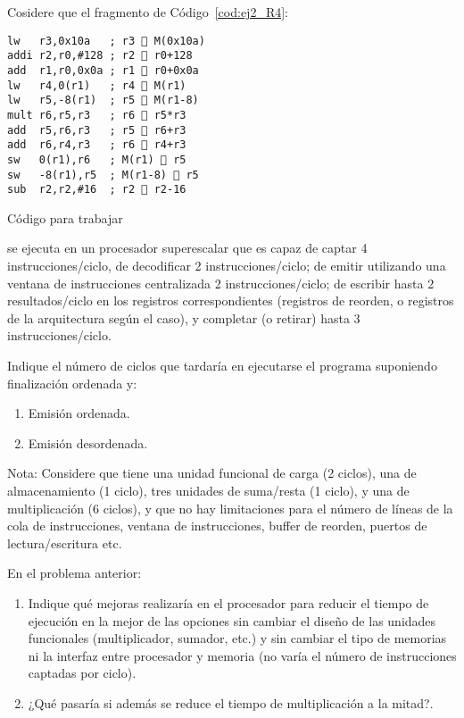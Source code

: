 \begin{ejercicio}
    Cosidere que el fragmento de Código~\ref{cod:ej2_R4}:
    \begin{listing}[H]
    \begin{verbatim}
lw   r3,0x10a   ; r3  M(0x10a)
addi r2,r0,#128 ; r2  r0+128
add  r1,r0,0x0a ; r1  r0+0x0a
lw   r4,0(r1)   ; r4  M(r1)
lw   r5,-8(r1)  ; r5  M(r1-8)
mult r6,r5,r3   ; r6  r5*r3
add  r5,r6,r3   ; r5  r6+r3
add  r6,r4,r3   ; r6  r4+r3
sw   0(r1),r6   ; M(r1)  r5
sw   -8(r1),r5  ; M(r1-8)  r5
sub  r2,r2,#16  ; r2  r2-16
    \end{verbatim}
    \caption{Código para trabajar}
    \label{cod:ej2_R4}
    \end{listing}
se ejecuta en un procesador superescalar que es capaz de captar 4 instrucciones/ciclo, de decodificar 2 instrucciones/ciclo; de emitir utilizando una ventana de instrucciones centralizada 2 instrucciones/ciclo; de escribir hasta 2 resultados/ciclo en los registros correspondientes (registros de reorden, o registros de la arquitectura según el caso), y completar (o retirar) hasta 3 instrucciones/ciclo.

Indique el número de ciclos que tardaría en ejecutarse el programa suponiendo finalización ordenada y:
\begin{enumerate}
    \item Emisión ordenada.
    \item Emisión desordenada.
\end{enumerate}
Nota: Considere que tiene una unidad funcional de carga (2 ciclos), una de almacenamiento (1 ciclo), tres unidades de suma/resta (1 ciclo), y una de multiplicación (6 ciclos), y que no hay limitaciones para el número de líneas de la cola de instrucciones, ventana de instrucciones, buffer de reorden, puertos de lectura/escritura etc.
\end{ejercicio}

\begin{ejercicio}\label{ej:3_R4}
   En el problema anterior: 
   \begin{enumerate}
       \item Indique qué mejoras realizaría en el procesador para reducir el tiempo de ejecución en la mejor de las opciones sin cambiar el diseño de las unidades funcionales (multiplicador, sumador, etc.) y sin cambiar el tipo de memorias ni la interfaz entre procesador y memoria (no varía el número de instrucciones captadas por ciclo).
       \item ¿Qué pasaría si además se reduce el tiempo de multiplicación a la mitad?. 
   \end{enumerate}
\end{ejercicio}

